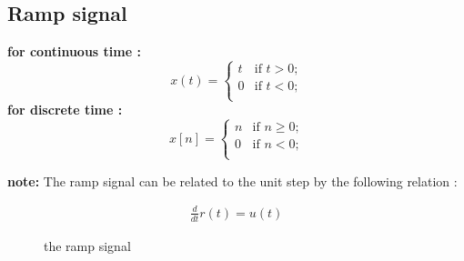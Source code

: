 \documentclass[a4paper,12pt]{book}
\begin{document}
\subsection*{ Ramp signal}
{\bf for continuous time :}\\
	\[ x(t) = \left\{ \begin{array}{ll}

	t & \mbox{if $t > 0$;} \\

	0 & \mbox{if $t < 0$;} \\

	\end{array}
	\right. \]
\bigskip
{\bf for discrete time :}\\
	\[ x[n] = \left\{ \begin{array}{ll}

	n & \mbox{if $n \geq 0$;} \\

	0 & \mbox{if $n < 0$;} \\

	\end{array}
	\right. \]

{\bf note:} The ramp signal can be related to the unit step by the following relation :

\begin{align*}
\frac{d }{dt}r(t) = u(t)
\end{align*}

\begin{figure}[h]  
\centering 
{}\hspace{6mm}
\caption{the ramp signal} \label{fig:M}  
\end{figure}
\end{document}
